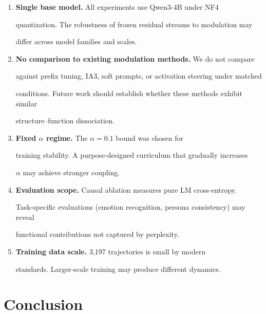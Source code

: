 \documentclass[11pt,a4paper]{article}
\begin{document}
\begin{enumerate}

  \item \textbf{Single base model.} All experiments use Qwen3-4B under NF4

    quantization. The robustness of frozen residual streams to modulation may

    differ across model families and scales.



  \item \textbf{No comparison to existing modulation methods.} We do not compare

    against prefix tuning, IA3, soft prompts, or activation steering under matched

    conditions. Future work should establish whether these methods exhibit similar

    structure--function dissociation.



  \item \textbf{Fixed $\alpha$ regime.} The $\alpha = 0.1$ bound was chosen for

    training stability. A purpose-designed curriculum that gradually increases

    $\alpha$ may achieve stronger coupling.



  \item \textbf{Evaluation scope.} Causal ablation measures pure LM cross-entropy.

    Task-specific evaluations (emotion recognition, persona consistency) may reveal

    functional contributions not captured by perplexity.



  \item \textbf{Training data scale.} 3,197 trajectories is small by modern

    standards. Larger-scale training may produce different dynamics.

\end{enumerate}




\section{Conclusion}
\end{document}
